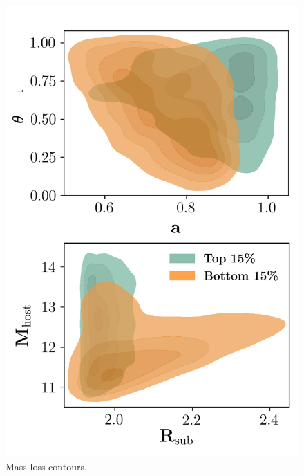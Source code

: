 \documentclass[fleqn,usenatbib]{mnras}
\begin{document}
\begin{figure}
	\includegraphics[width=\textwidth]{Figures/massloss_contours}
    \caption{Mass loss contours.}
    \label{fig:massloss_contours}
\end{figure}
\end{document}
